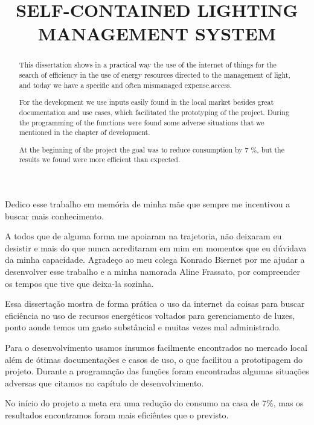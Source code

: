 \documentclass[openright]{normas-utf-tex} %
\title{\MakeUppercase{Self-contained lighting management system}} %
\begin{document}
\capa %
\folhaderosto %

\fichacatpgbib{\pageref{bibstart}-\pageref{bibend}}
\fichacat



\begin{dedicatoria}
Dedico esse trabalho em memória de minha mãe que sempre me incentivou a buscar mais conhecimento.
\end{dedicatoria}

\begin{agradecimentos}
A todos que de alguma forma me apoiaram na trajetoria, não deixaram eu desistir e mais do que nunca acreditaram em mim em momentos que eu dúvidava da minha capacidade.
Agradeço ao meu colega Konrado Biernet por me ajudar a desenvolver esse trabalho e a minha namorada Aline Frassato, por compreender os tempos que tive que deixa-la sozinha.
\end{agradecimentos}

\begin{resumo}
Essa dissertação mostra de forma prática o uso da internet da coisas para buscar eficiência no uso de recursos energéticos voltados para gerenciamento de luzes, ponto aonde temos um gasto substâncial e muitas vezes mal administrado.

Para o desenvolvimento usamos insumos facilmente encontrados no mercado local além de ótimas documentações e casos de uso, o que facilitou a prototipagem do projeto. Durante a programação das funções foram encontradas algumas situações adversas que citamos no capítulo de desenvolvimento. 

No início do projeto a meta era uma redução do consumo na casa de 7\%, mas os resultados encontramos foram mais eficiêntes que o previsto.

\end{resumo}

\begin{abstract}
This dissertation shows in a practical way the use of the internet of things for the search of efficiency in the use of energy resources directed to the management of light, and today we have a specific and often mismanaged expense.access.

For the development we use inputs easily found in the local market besides great documentation and use cases, which facilitated the prototyping of the project. During the programming of the functions were found some adverse situations that we mentioned in the chapter of development.

At the beginning of the project the goal was to reduce consumption by 7 \%, but the results we found were more efficient than expected.
\end{abstract}
\end{document}
